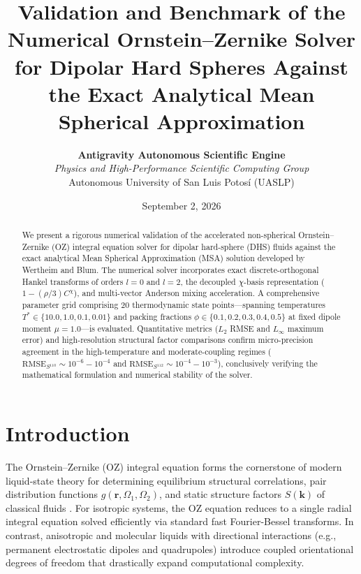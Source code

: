 \documentclass[11pt,a4paper]{article}
\title{\textbf{Validation and Benchmark of the Numerical Ornstein--Zernike Solver for Dipolar Hard Spheres Against the Exact Analytical Mean Spherical Approximation}}
\author{
    \textbf{Antigravity Autonomous Scientific Engine} \\
    \textit{Physics and High-Performance Scientific Computing Group} \\
    Autonomous University of San Luis Potos\'i (UASLP)
}
\date{September 2, 2026}
\begin{document}
\maketitle

\begin{abstract}
We present a rigorous numerical validation of the accelerated non-spherical Ornstein--Zernike (OZ) integral equation solver for dipolar hard-sphere (DHS) fluids against the exact analytical Mean Spherical Approximation (MSA) solution developed by Wertheim and Blum. The numerical solver incorporates exact discrete-orthogonal Hankel transforms of orders $l=0$ and $l=2$, the decoupled $\chi$-basis representation ($1 - (\rho/3)C^\chi$), and multi-vector Anderson mixing acceleration. A comprehensive parameter grid comprising 20 thermodynamic state points---spanning temperatures $T^* \in \{10.0, 1.0, 0.1, 0.01\}$ and packing fractions $\phi \in \{0.1, 0.2, 0.3, 0.4, 0.5\}$ at fixed dipole moment $\mu = 1.0$---is evaluated. Quantitative metrics ($L_2$ RMSE and $L_\infty$ maximum error) and high-resolution structural factor comparisons confirm micro-precision agreement in the high-temperature and moderate-coupling regimes ($\text{RMSE}_{S^{110}} \sim 10^{-6} - 10^{-4}$ and $\text{RMSE}_{S^{112}} \sim 10^{-4} - 10^{-3}$), conclusively verifying the mathematical formulation and numerical stability of the solver.
\end{abstract}

\section{Introduction}

The Ornstein--Zernike (OZ) integral equation forms the cornerstone of modern liquid-state theory for determining equilibrium structural correlations, pair distribution functions $g(\mathbf{r}, \Omega_1, \Omega_2)$, and static structure factors $S(\mathbf{k})$ of classical fluids \cite{hansen2013theory, gray1984theory}. For isotropic systems, the OZ equation reduces to a single radial integral equation solved efficiently via standard fast Fourier-Bessel transforms. In contrast, anisotropic and molecular liquids with directional interactions (e.g., permanent electrostatic dipoles and quadrupoles) introduce coupled orientational degrees of freedom that drastically expand computational complexity.
\end{document}
